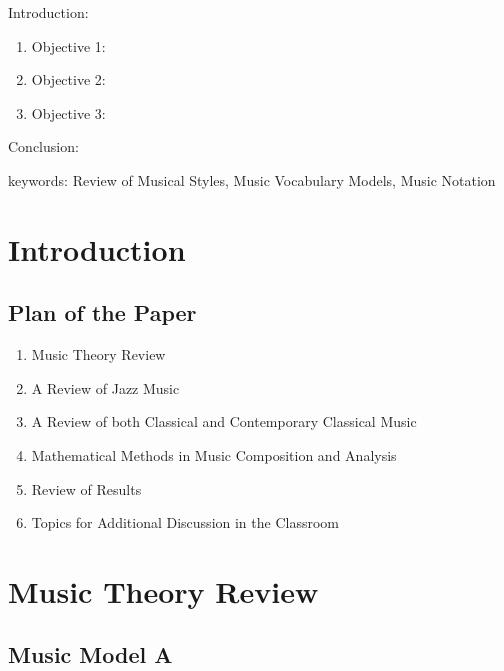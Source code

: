 


\twocolumn
\scriptsize
\begin{frontmatter}
		\title{}
		\author{}
		\address{The Mathematical Learning Space}
\end{frontmatter}	

Introduction:
\begin{enumerate}
\item Objective 1:
\item Objective 2:
\item Objective 3:
\end{enumerate}
Conclusion:

keywords: Review of Musical Styles, Music Vocabulary Models, Music Notation

\section{Introduction}

\subsection{Plan of the Paper}

\begin{enumerate}
\item Music Theory  Review
\item A Review of Jazz Music
\item A Review of both Classical and Contemporary Classical Music
\item Mathematical Methods in Music Composition and Analysis
\item Review of Results
\item Topics for Additional Discussion in the Classroom
\end{enumerate}

\section{Music Theory Review}

\subsection{Music Model A}

